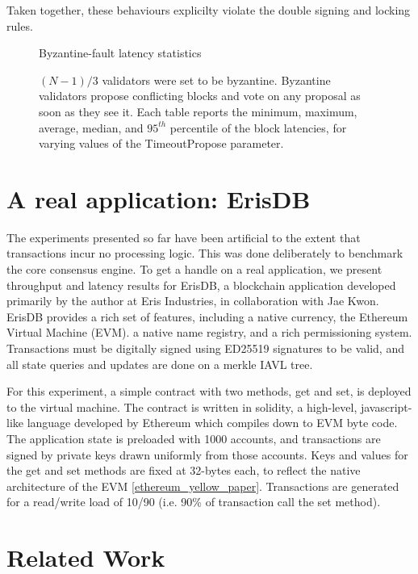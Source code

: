 Taken together, these behaviours explicilty violate the double signing and locking rules. 

\begin{figure}[]
	Byzantine-fault latency statistics	
	
	\label{fig:exp:byz_failure}
	\caption[Latency statistics under byzantine faults]{$(N-1)/3$ validators were set to be byzantine.
Byzantine validators propose conflicting blocks and vote on any proposal as soon as they see it.
Each table reports the minimum, maximum, average, median, and $95^{th}$ percentile of the block latencies, for varying values of the TimeoutPropose parameter.}
\end{figure}


\section{A real application: ErisDB}

The experiments presented so far have been artificial to the extent that transactions incur no processing logic.
This was done deliberately to benchmark the core consensus engine. 
To get a handle on a real application, we present throughput and latency results for ErisDB, 
a blockchain application developed primarily by the author at Eris Industries, in collaboration with Jae Kwon.
ErisDB provides a rich set of features, including a native currency, the Ethereum Virtual Machine (EVM).
a native name registry, and a rich permissioning system.
Transactions must be digitally signed using ED25519 signatures to be valid, and all state queries and updates are done on a merkle IAVL tree.

For this experiment, a simple contract with two methods, get and set, is deployed to the virtual machine.
The contract is written in solidity, a high-level, javascript-like language developed by Ethereum which compiles down to EVM byte code.
The application state is preloaded with 1000 accounts, and transactions are signed by private keys drawn uniformly from those accounts.
Keys and values for the get and set methods are fixed at 32-bytes each, to reflect the native architecture of the EVM \ref{ethereum_yellow_paper}.
Transactions are generated for a read/write load of 10/90 (i.e. 90\% of transaction call the set method).

\section{Related Work}
